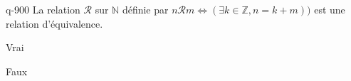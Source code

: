\begin{truefalse}{q-900}
La relation $\mathcal R$ sur $\mathbb N$ définie par $n\mathcal R m \iff (\exists k\in\mathbb Z,n=k+m))$ est une relation d'équivalence.
\item* Vrai
\item Faux
\end{truefalse}

